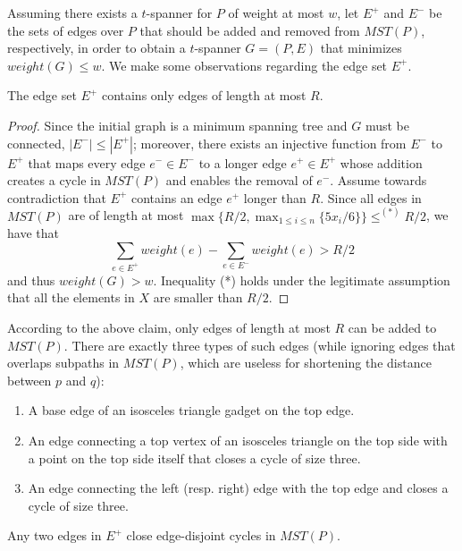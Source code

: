 \documentclass[a4paper]{llncs}
\begin{document}
Assuming there exists a $t$-spanner for $P$ of weight at most $w$,
let $E^+$ and $E^-$ be the sets of edges over $P$ that should be added and removed 
from $MST(P)$, respectively, in order to obtain a $t$-spanner $G=(P,E)$ 
that minimizes $weight(G) \leq w$.
We make some observations regarding the edge set $E^+$.

\begin{myclaim}\label{cl:short_edges}
The edge set $E^+$ contains only edges of length at most $R$.
\end{myclaim}

\begin{proof}
Since the initial graph is a minimum spanning tree and $G$ must be connected, $|E^-| \leq |E^+|$; 
moreover, there exists an injective function from $E^-$ to $E^+$ 
that maps every edge $e^- \in E^-$ to a longer edge $e^+ \in E^+$ 
whose addition creates a cycle in $MST(P)$ and enables the removal of $e^-$. 
Assume towards contradiction that $E^+$ contains an edge $e^+$ longer than $R$.
Since all edges in $MST(P)$ are of length at most $\max\{R/2,\max_{1\leq i\leq n}\{5x_i/6 \}\}\leq^{(*)} R/2$,
we have that $$\sum_{e \in E^+}{weight(e)} - \sum_{e \in E^-}{weight(e)} > R/2$$
and thus $weight(G)>w$. Inequality (*) holds under the legitimate assumption that all the elements in $X$ are
smaller than $R/2$.
\end{proof}

According to the above claim, only edges of length at most $R$ can be added to $MST(P)$.
There are exactly three types of such edges 
(while ignoring edges that overlaps subpaths in $MST(P)$, 
which are useless for shortening the distance between $p$ and $q$):

\begin{enumerate}
\item A base edge of an isosceles triangle gadget on the top edge.
\item An edge connecting a top vertex of an isosceles triangle on the top side 
			with a point on the top side itself that closes a cycle of size three.
\item An edge connecting the left (resp. right) edge with the top edge 
			and closes a cycle of size three.
\end{enumerate} 

\begin{observation}\label{obs:disjoint}
Any two edges in $E^+$ close edge-disjoint cycles in $MST(P)$.
\end{observation}
\end{document}
